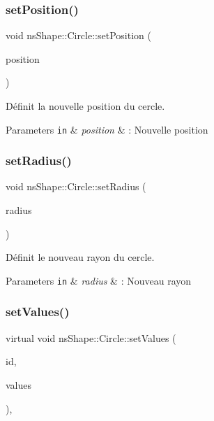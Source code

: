 \subsubsection{\texorpdfstring{set\+Position()}{setPosition()}}
{\footnotesize\ttfamily void ns\+Shape\+::\+Circle\+::set\+Position (\begin{DoxyParamCaption}\item[{const \hyperlink{classns_graphics_1_1_vec2_d}{ns\+Graphics\+::\+Vec2D} \&}]{position }\end{DoxyParamCaption})}



Définit la nouvelle position du cercle. 


\begin{DoxyParams}[1]{Parameters}
\mbox{\tt in}  & {\em position} & \+: Nouvelle position \\
\hline
\end{DoxyParams}
\mbox{\label{classns_shape_1_1_circle_a5f20408e41621d21487b6162eabc3a7d}} 
\subsubsection{\texorpdfstring{set\+Radius()}{setRadius()}}
{\footnotesize\ttfamily void ns\+Shape\+::\+Circle\+::set\+Radius (\begin{DoxyParamCaption}\item[{const unsigned \&}]{radius }\end{DoxyParamCaption})}



Définit le nouveau rayon du cercle. 


\begin{DoxyParams}[1]{Parameters}
\mbox{\tt in}  & {\em radius} & \+: Nouveau rayon \\
\hline
\end{DoxyParams}
\mbox{\label{classns_shape_1_1_circle_a3edfd0468ef78f456c4fc4fd57c84cdf}} 
\subsubsection{\texorpdfstring{set\+Values()}{setValues()}}
{\footnotesize\ttfamily virtual void ns\+Shape\+::\+Circle\+::set\+Values (\begin{DoxyParamCaption}\item[{const int \&}]{id,  }\item[{const std\+::vector$<$ float $>$ \&}]{values }\end{DoxyParamCaption})\hspace{0.3cm}{\ttfamily [override]}, {\ttfamily [virtual]}}



